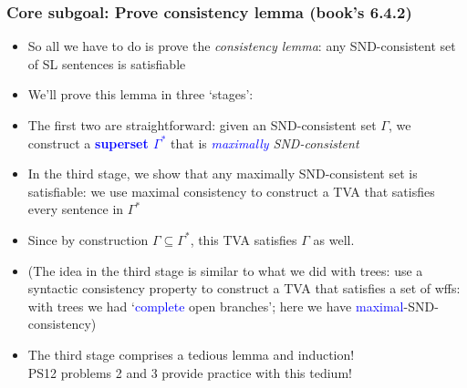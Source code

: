 \begin{frame}
\frametitle{Core subgoal: Prove consistency lemma (book's 6.4.2)}

\begin{itemize}[<+->]

\item So all we have to do is prove the \emph{consistency lemma}: any SND-consistent set of SL sentences is satisfiable

\item We'll prove this lemma in three `stages':

\item The first two are straightforward: given an SND-consistent set $\Gamma$, we construct a \textbf{\textcolor{blue}{superset $\Gamma^{\ast}$}} that is \textit{\textcolor{blue}{maximally} SND-consistent}

\item In the third stage, we show that any maximally SND-consistent set is \alert{satisfiable}: we use maximal consistency to construct a TVA that satisfies every sentence in $\Gamma^{\ast}$

\item Since by construction $\Gamma \subseteq \Gamma^{\ast}$, this TVA satisfies $\Gamma$ as well. 

\item \footnotesize{(The idea in the third stage is similar to what we did with trees: use a syntactic consistency property to construct a TVA that satisfies a set of wffs: with trees we had `\textcolor{blue}{complete} \alert{open} branches'; here we have \textcolor{blue}{maximal}-\alert{SND-consistency})} 
\item The third stage comprises a tedious lemma and induction! \\ PS12 problems 2 and 3 provide practice with this tedium! 



\end{itemize}
\end{frame}

